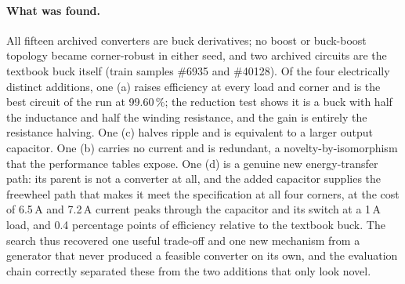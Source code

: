 \paragraph{What was found.}
All fifteen archived converters are buck derivatives; no boost or buck-boost
topology became corner-robust in either seed, and two archived circuits are
the textbook buck itself (train samples \#6935 and \#40128). Of the four
electrically distinct additions, one (a) raises efficiency at every load and
corner and is the best circuit of the run at 99.60\,\%; the reduction test
shows it is a buck with half the inductance and half the winding resistance,
and the gain is entirely the resistance halving. One (c) halves ripple and is
equivalent to a larger output capacitor. One (b) carries no current and is
redundant, a novelty-by-isomorphism that the performance tables expose. One
(d) is a genuine new energy-transfer path: its parent is not a converter at
all, and the added capacitor supplies the freewheel path that makes it meet
the specification at all four corners, at the cost of 6.5\,A and 7.2\,A current
peaks through the capacitor and its switch at a 1\,A load, and 0.4 percentage
points of efficiency relative to the textbook buck. The search thus
recovered one useful trade-off and one new mechanism from a generator that
never produced a feasible converter on its own, and the evaluation chain
correctly separated these from the two additions that only look novel.
